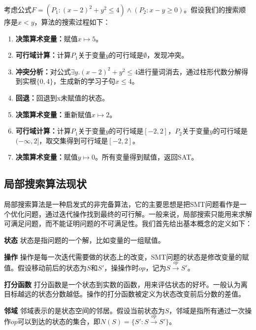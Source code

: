 \begin{example}
考虑公式$F=(P_1: (x-2)^2 + y^2 \le 4) \wedge (P_2: x - y \ge 0)$。假设我们的搜索顺序是$x < y$，算法的搜索过程如下：
\begin{enumerate}
    \item \textbf{决策算术变量：}赋值$x \mapsto 5$。
    \item \textbf{可行域计算：}计算$P_1$关于变量$y$的可行域是$\emptyset$，发现冲突。
    \item \textbf{冲突分析：}对公式$\exists y. (x-2)^2 + y^2 \le 4$进行量词消去，通过柱形代数分解得到实根$\{0, 4\}$，生成新的学习子句$x \le 4$。
    \item \textbf{回退：}回退到x未赋值的状态。
    \item \textbf{决策算术变量：}重新赋值$x \mapsto 2$。
    \item \textbf{可行域计算：}计算$P_1$关于变量$y$的可行域是$[-2, 2]$，$P_2$关于变量$y$的可行域是$(-\infty, 2]$，取交集得到可行域是$[-2, 2]$。
    \item \textbf{决策算术变量：}赋值$y \mapsto 0$。所有变量得到赋值，返回SAT。
\end{enumerate}
\label{ex:nlsat}
\end{example}

\subsection{局部搜索算法现状}
局部搜索算法是一种启发式的非完备算法，它的主要思想是把SMT问题看作是一个优化问题，通过迭代操作找到最终的可行解。一般来说，局部搜索只能用来求解可满足问题，而不能证明问题的不可满足性。我们首先给出基本概念的定义如下：

\begin{definition}{\textbf{状态}}
状态是指问题的一个解，比如变量的一组赋值。
\end{definition}

\begin{definition}{\textbf{操作}}
操作是每一次迭代需要做的状态上的改变，SMT问题的状态是修改变量的赋值。假设移动前后的状态为$S$和$S'$，操操作时$op$，记为$S \xrightarrow{op} S'$。
\end{definition}

\begin{definition}{\textbf{打分函数}}
打分函数是一个状态到实数的函数，用来评估状态的好坏。一般认为离目标越远的状态分数越低。操作的打分函数被定义为状态改变前后分数的差值。
\end{definition}

\begin{definition}{\textbf{邻域}}
邻域表示的是状态空间的邻居。假设当前状态为$S$，邻域是指所有通过一次操作$op$可以到达的状态的集合，即$N(S) = \{S' : S \xrightarrow{op} S'\}$。
\end{definition}

